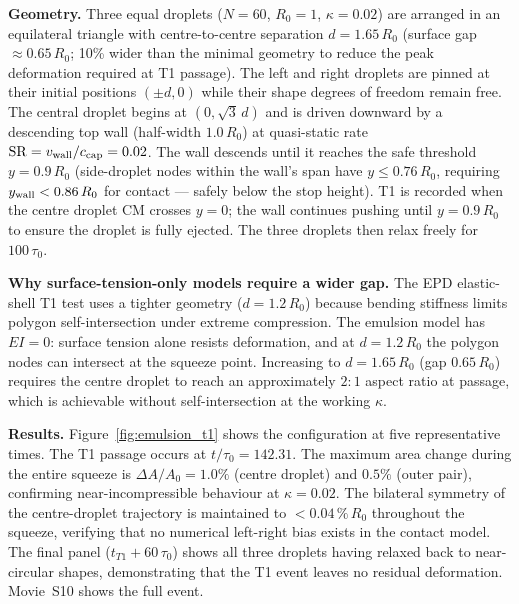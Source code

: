\documentclass[aps,pre,twocolumn,floatfix,longbibliography]{revtex4-2}
\begin{document}
\textbf{Geometry.}  Three equal droplets ($N = 60$, $R_0 = 1$, $\kappa = 0.02$) are
arranged in an equilateral triangle with centre-to-centre separation $d = 1.65\,R_0$
(surface gap $\approx 0.65\,R_0$; 10\% wider than the minimal geometry to reduce the
peak deformation required at T1 passage).  The left and right droplets are pinned at
their initial positions $(\pm d, 0)$ while their shape degrees of freedom remain free.
The central droplet begins at $(0, \sqrt{3}\,d)$ and is driven downward by a
descending top wall (half-width $1.0\,R_0$) at quasi-static rate
$\mathrm{SR} = v_{\rm wall}/c_{\rm cap} = 0.02$.
The wall descends until it reaches the safe threshold $y = 0.9\,R_0$ (side-droplet
nodes within the wall's span have $y \leq 0.76\,R_0$, requiring $y_{\rm wall} < 0.86\,R_0$
for contact — safely below the stop height).  T1 is recorded when the centre droplet
CM crosses $y = 0$; the wall continues pushing until $y = 0.9\,R_0$ to ensure the
droplet is fully ejected.  The three droplets then relax freely for $100\,\tau_0$.

\textbf{Why surface-tension-only models require a wider gap.}  The EPD elastic-shell
T1 test uses a tighter geometry ($d = 1.2\,R_0$) because bending stiffness limits
polygon self-intersection under extreme compression.  The emulsion model has $EI = 0$:
surface tension alone resists deformation, and at $d = 1.2\,R_0$ the polygon nodes
can intersect at the squeeze point.  Increasing to $d = 1.65\,R_0$ (gap $0.65\,R_0$)
requires the centre droplet to reach an approximately $2{:}1$ aspect ratio at
passage, which is achievable without self-intersection at the working $\kappa$.

\textbf{Results.}  Figure~\ref{fig:emulsion_t1} shows the configuration at five
representative times.  The T1 passage occurs at $t/\tau_0 = 142.31$.  The maximum
area change during the entire squeeze is $\Delta A/A_0 = 1.0\%$ (centre droplet)
and $0.5\%$ (outer pair), confirming near-incompressible behaviour at $\kappa = 0.02$.
The bilateral symmetry of the centre-droplet trajectory is maintained to
$< 0.04\,\%\,R_0$ throughout the squeeze, verifying that no numerical left-right
bias exists in the contact model.  The final panel ($t_{T1} + 60\,\tau_0$) shows
all three droplets having relaxed back to near-circular shapes, demonstrating
that the T1 event leaves no residual deformation.  Movie~S10 shows the full event.
\end{document}
